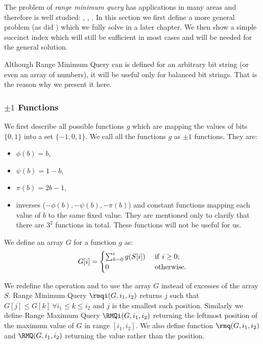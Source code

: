 The problem of \emph{range minimum query} has applications in many areas and therefore is well studied: \cite{bender2000lca}, \cite{fischer2010optimal}, \cite{durocher2013simple}.
In this section we first define a more general problem (as did \cite{sadakane2010fully}) which we fully solve in a later chapter.
We then show a simple succinct index which will still be sufficient in most cases and will be needed for the general solution.

Although Range Minimum Query can is defined for an arbitrary bit string (or even an array of numbers), it will be useful only for balanced bit strings.
That is the reason why we present it here.

\subsubsection{$\pm 1$ Functions}\label{ss:rmq-def}

We first describe all possible functions $g$ which are mapping the values of bits $\{0, 1\}$ into a set $\{-1, 0, 1\}$.
We call all the functions $g$ as $\pm 1$ functions.
They are:
\begin{itemize}
	\item $\phi(b) = b$,
	\item $\psi(b) = 1 - b$,
	\item $\pi(b) = 2 b - 1$,
	\item inverses ($-\phi(b), -\psi(b), -\pi(b)$) and constant functions mapping each value of $b$ to the same fixed value.
	They are mentioned only to clarify that there are $3^2$ functions in total.
	These functions will not be useful for us.
\end{itemize}

We define an array $G$ for a function $g$ as:
$$ G[i] = \begin{cases}
	\sum_{k = 0}^i g(S[i]) & \ \textrm{\textnormal{if}}\  i \ge 0; \\
	0 & \ \textrm{\textnormal{otherwise}}.
\end{cases} $$

\bigbreak

We redefine the operation \rmqi{} and \RMQi{} to use the array $G$ instead of excesses of the array $S$.
Range Minimum Query $\rmqi(G, i_1, i_2)$ returns $j$ such that $G[j] \le G[k] \ \forall i_1 \le k \le i_2$ and $j$ is the smallest such position.
Similarly we define Range Maximum Query $\RMQi(G, i_1, i_2)$ returning the leftmost position of the maximum value of $G$ in range $[i_1, i_2]$.
We also define function $\rmq(G, i_1, i_2)$ and $\RMQ(G, i_1, i_2)$ returning the value rather than the position.


